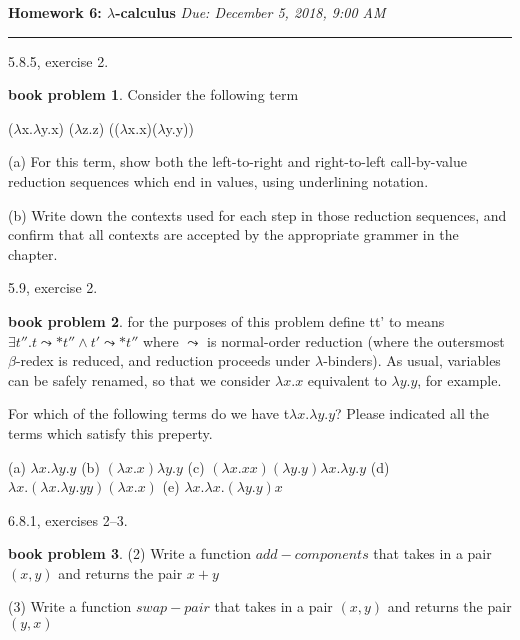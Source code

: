\documentclass[10pt]{article}
\theoremstyle{definition}
\newtheorem{bp}{book problem}
\begin{document}
\noindent
\textbf{Homework 6: $\lambda$-calculus} \hfill \emph{Due: December 5, 2018, 9:00 AM}
\hrule

\vspace{.3in}

5.8.5, exercise 2.

\begin{bp}
  Consider the following term

  ($\lambda$x.$\lambda$y.x) ($\lambda$z.z) (($\lambda$x.x)($\lambda$y.y))

  (a) For this term, show both the left-to-right and right-to-left call-by-value reduction sequences which end in values, using underlining notation.

  (b) Write down the contexts used for each step in those reduction sequences, and confirm that all contexts are accepted by the appropriate grammer in the chapter. 

\end{bp}

5.9, exercise 2.

\begin{bp}
 for the purposes of this problem define  t\textdownarrow t' to means $\exists t''.t \leadsto* t'' \wedge t' \leadsto * t'' $ where $\leadsto$ is normal-order reduction (where the outersmost $\beta$-redex is reduced, and reduction proceeds under $\lambda$-binders). As usual, variables can be safely renamed, so that we consider $\lambda x.x$ equivalent to $\lambda y.y$, for example.

 For which of the following terms do we have t\textdownarrow$\lambda x.\lambda y.y$? Please indicated all the terms which satisfy this preperty.

 (a) $\lambda x. \lambda y.y$ \newline
 (b) $(\lambda x.x) \lambda y.y$ \newline
 (c) $( \lambda x.x x)( \lambda y.y) \lambda x. \lambda y.y$ \newline
 (d) $ \lambda x.( \lambda x. \lambda y.y y)( \lambda x.x)$
 (e) $ \lambda x.\lambda x.(\lambda y.y)x$
\end{bp}

6.8.1, exercises 2--3.

\begin{bp}

  (2) Write a function $add-components$ that takes in a pair $(x,y)$ and returns the pair $x + y$

  (3) Write a function $swap-pair$ that takes in a pair $(x,y)$ and returns the pair $(y,x)$

\end{bp}
\end{document}
